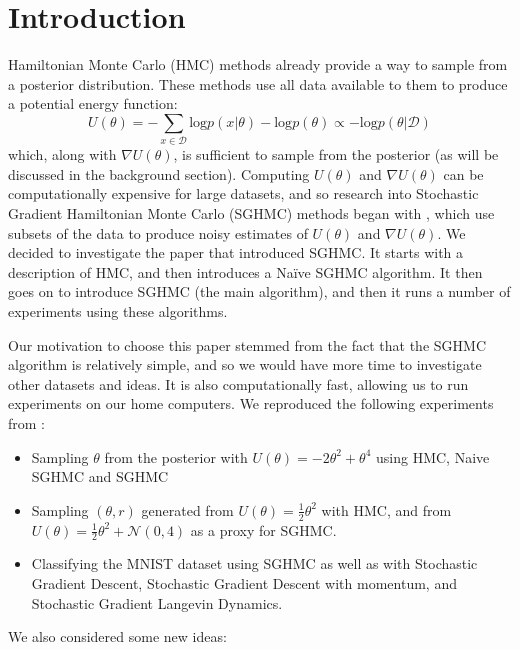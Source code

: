 
\section{Introduction}

Hamiltonian Monte Carlo (HMC) methods already provide a way to sample from a posterior distribution. These methods use all data available to them to produce a potential energy function:
\begin{equation*}
    U(\theta) = - \sum_{x\in\mathcal{D}}\text{log}p(x| \theta) - \text{log}p(\theta ) \propto -\text{log}p(\theta | \mathcal{D})
\end{equation*}
which, along with $\nabla U(\theta)$, is sufficient to sample from the posterior (as will be discussed in the background section). Computing $U(\theta)$ and $\nabla U(\theta)$ can be computationally expensive for large datasets, and so research into Stochastic Gradient Hamiltonian Monte Carlo (SGHMC) methods began with \cite{sghmc}, which use subsets of the data to produce noisy estimates of $U(\theta)$ and $\nabla U(\theta)$. We decided to investigate the paper that introduced SGHMC. It starts with a description of HMC, and then introduces a Naïve SGHMC algorithm. It then goes on to introduce SGHMC (the main algorithm), and then it runs a number of experiments using these algorithms.

Our motivation to choose this paper stemmed from the fact that the SGHMC algorithm is relatively simple, and so we would have more time to investigate other datasets and ideas. It is also computationally fast, allowing us to run experiments on our home computers. We reproduced the following experiments from \cite{sghmc}:

\begin{itemize}
    \item Sampling $\theta$ from the posterior with $U(\theta) = -2\theta^2 + \theta^4$ using HMC, Naive SGHMC and SGHMC
    \item Sampling $(\theta,r)$ generated from $U(\theta) = \frac{1}{2}\theta^2$ with HMC, and from $U(\theta) = \frac{1}{2}\theta^2 + \mathcal{N}(0,4)$ as a proxy for SGHMC.
    \item Classifying the MNIST dataset using SGHMC as well as with Stochastic Gradient Descent, Stochastic Gradient Descent with momentum, and Stochastic Gradient Langevin Dynamics.
\end{itemize}

We also considered some new ideas:

